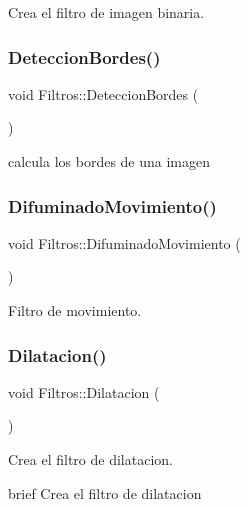 Crea el filtro de imagen binaria. 

\mbox{\label{class_filtros_a9bed709d7363047dc9ec1449c4dd00b4}} 
\subsubsection{\texorpdfstring{Deteccion\+Bordes()}{DeteccionBordes()}}
{\footnotesize\ttfamily void Filtros\+::\+Deteccion\+Bordes (\begin{DoxyParamCaption}{ }\end{DoxyParamCaption})}



calcula los bordes de una imagen 

\mbox{\label{class_filtros_a5826f19a9932e321c29fd1efa9c70e4d}} 
\subsubsection{\texorpdfstring{Difuminado\+Movimiento()}{DifuminadoMovimiento()}}
{\footnotesize\ttfamily void Filtros\+::\+Difuminado\+Movimiento (\begin{DoxyParamCaption}{ }\end{DoxyParamCaption})}



Filtro de movimiento. 

\mbox{\label{class_filtros_a6b296610ee0b6f782d9be9f8c4ad25c2}} 
\subsubsection{\texorpdfstring{Dilatacion()}{Dilatacion()}}
{\footnotesize\ttfamily void Filtros\+::\+Dilatacion (\begin{DoxyParamCaption}{ }\end{DoxyParamCaption})}



Crea el filtro de dilatacion. 

brief Crea el filtro de dilatacion

